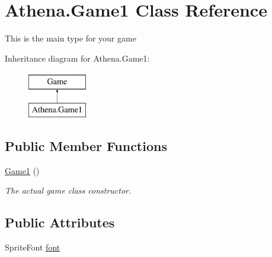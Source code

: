 \hypertarget{class_athena_1_1_game1}{\section{Athena.\-Game1 Class Reference}
\label{class_athena_1_1_game1}
}


This is the main type for your game  


Inheritance diagram for Athena.\-Game1\-:\begin{figure}[H]
\begin{center}
\leavevmode
\includegraphics[height=2.000000cm]{class_athena_1_1_game1}
\end{center}
\end{figure}
\subsection*{Public Member Functions}
\begin{DoxyCompactItemize}
\item 
\hyperlink{class_athena_1_1_game1_a8ffc80aa170e7c9f0a9dd37cbeb7fd76}{Game1} ()
\begin{DoxyCompactList}\small\item\em The actual game class constructor. \end{DoxyCompactList}\end{DoxyCompactItemize}
\subsection*{Public Attributes}
\begin{DoxyCompactItemize}
\item 
Sprite\-Font \hyperlink{class_athena_1_1_game1_a95889f78b571ae01c8470c884cde9076}{font}
\end{DoxyCompactItemize}
